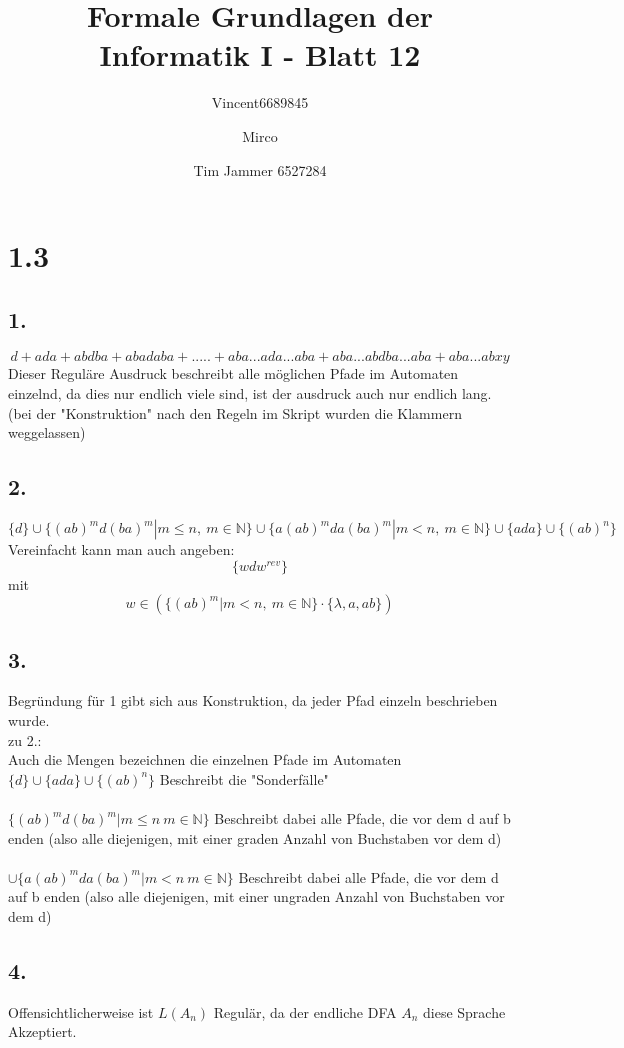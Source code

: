 \documentclass[12pt,a4paper]{article}
\title{Formale Grundlagen der Informatik I - Blatt 12}
\author{Vincent6689845  \and Mirco \and Tim Jammer 6527284}
\begin{document}
\maketitle{}

\section*{1.3}

\subsection*{1.}
\[d+ada+abdba+abadaba+.....+aba...ada...aba+aba...abdba...aba+aba...abxy\]
Dieser Reguläre Ausdruck beschreibt alle möglichen Pfade im Automaten einzelnd, da dies nur endlich viele sind, ist der ausdruck auch nur endlich lang.
(bei der "{}Konstruktion"{} nach den Regeln im Skript wurden die Klammern weggelassen)
\subsection*{2.}
\[\{d\}\cup \{(ab)^md(ba)^m|m\leq n,\ m\in\mathbb{N}\} \cup \{a(ab)^mda(ba)^m|m< n,\ m\in\mathbb{N}\} \cup \{ada\}\cup \{(ab)^n\}\]
Vereinfacht kann man auch angeben:
\[\{wdw^{rev}\}\]
mit
\[w\in \left(\{(ab)^m|m<n,\ m\in\mathbb{N}\}\cdot \{\lambda,a,ab\}\right) \]
\subsection*{3.}
Begründung für 1 gibt sich aus Konstruktion, da jeder Pfad einzeln beschrieben wurde.\\
zu 2.:\\
Auch die Mengen bezeichnen die einzelnen Pfade im Automaten
$\{d\} \cup \{ada\}\cup \{(ab)^n\}$ Beschreibt die "{}Sonderfälle"{}\\
\\
$ \{(ab)^md(ba)^m|m\leq n\ m\in\mathbb{N}\}$ Beschreibt dabei alle Pfade, die vor dem d auf b enden (also alle diejenigen, mit einer graden Anzahl von Buchstaben vor dem d)\\
\\
$ \cup \{a(ab)^mda(ba)^m|m< n\ m\in\mathbb{N}\}$ Beschreibt dabei alle Pfade, die vor dem d auf b enden (also alle diejenigen, mit einer ungraden Anzahl von Buchstaben vor dem d)\\
\subsection*{4.}
Offensichtlicherweise ist $L(A_n)$ Regulär, da der endliche DFA $A_n$ diese Sprache Akzeptiert.
\end{document}
